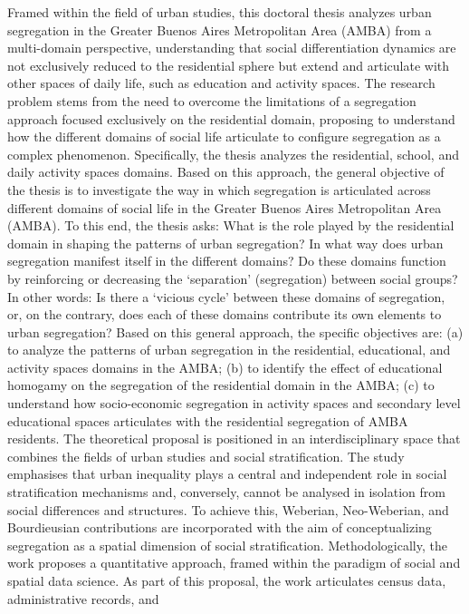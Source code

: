 \documentclass[
  spanish,
  a4paper,%
  chapterprefix=true,%
  DIV=calc,%
  twoside]{scrbook}%
\begin{document}
Framed within the field of urban studies, this doctoral thesis analyzes urban
segregation in the Greater Buenos Aires Metropolitan Area (AMBA) from a
multi-domain perspective, understanding that social differentiation dynamics
are not exclusively reduced to the residential sphere but extend and articulate
with other spaces of daily life, such as education and activity spaces. The
research problem stems from the need to overcome the limitations of a segregation
approach focused exclusively on the residential domain, proposing to understand
how the different domains of social life articulate to configure segregation as
a complex phenomenon. Specifically, the thesis analyzes the residential, school,
and daily activity spaces domains. Based on this approach, the general objective
of the thesis is to investigate the way in which segregation is articulated
across different domains of social life in the Greater Buenos Aires Metropolitan
Area (AMBA). To this end, the thesis asks: What is the role played by the
residential domain in shaping the patterns of urban segregation? In what way does
urban segregation manifest itself in the different domains? Do these domains
function by reinforcing or decreasing the `separation' (segregation) between
social groups? In other words: Is there a `vicious cycle' between these domains
of segregation, or, on the contrary, does each of these domains contribute its
own elements to urban segregation? Based on this general approach, the specific
objectives are: (a) to analyze the patterns of urban segregation in the
residential, educational, and activity spaces domains in the AMBA; (b) to
identify the effect of educational homogamy on the segregation of the residential
domain in the AMBA; (c) to understand how socio-economic segregation in activity
spaces and secondary level educational spaces articulates with the residential
segregation of AMBA residents. The theoretical proposal is positioned in an
interdisciplinary space that combines the fields of urban studies and social
stratification. The study emphasises that urban inequality plays a central and
independent role in social stratification mechanisms and, conversely, cannot be
analysed in isolation from social differences and structures. To achieve this,
Weberian, Neo-Weberian, and Bourdieusian contributions are incorporated with the
aim of conceptualizing segregation as a spatial dimension of social
stratification. Methodologically, the work proposes a quantitative approach,
framed within the paradigm of social and spatial data science. As part
of this proposal, the work articulates census data, administrative records, and
\end{document}
